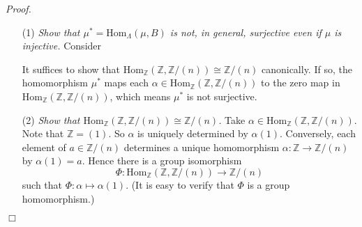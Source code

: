 \documentclass{article}
\begin{document}
\emph{Proof.}
\begin{enumerate}
\item[(1)]
  \emph{Show that $\mu^{*} = \mathrm{Hom}_{\Lambda}(\mu,B)$ is not, in general,
  surjective even if $\mu$ is injective.}
  Consider
  \begin{center}
  \end{center}
  It suffices to show that
  $\mathrm{Hom}_{\mathbb{Z}}(\mathbb{Z},\mathbb{Z}/(n)) \cong \mathbb{Z}/(n)$
  canonically.
  If so, the homomorphism $\mu^{*}$ maps each
  $\alpha \in \mathrm{Hom}_{\mathbb{Z}}(\mathbb{Z},\mathbb{Z}/(n))$
  to the zero map in $\mathrm{Hom}_{\mathbb{Z}}(\mathbb{Z},\mathbb{Z}/(n))$,
  which means $\mu^{*}$ is not surjective.

\item[(2)]
  \emph{Show that $\mathrm{Hom}_{\mathbb{Z}}(\mathbb{Z},\mathbb{Z}/(n)) \cong \mathbb{Z}/(n)$.}
  Take $\alpha \in \mathrm{Hom}_{\mathbb{Z}}(\mathbb{Z},\mathbb{Z}/(n))$.
  Note that $\mathbb{Z} = (1)$.
  So $\alpha$ is uniquely determined by $\alpha(1)$.
  Conversely, each element of $a \in \mathbb{Z}/(n)$ determines
  a unique homomorphism $\alpha: \mathbb{Z} \to \mathbb{Z}/(n)$ by $\alpha(1) = a$.
  Hence there is a group isomorphism
  \[
    \Phi: \mathrm{Hom}_{\mathbb{Z}}(\mathbb{Z},\mathbb{Z}/(n)) \to \mathbb{Z}/(n)
  \]
  such that $\Phi: \alpha \mapsto \alpha(1)$.
  (It is easy to verify that $\Phi$ is a group homomorphism.)
\end{enumerate}
$\Box$ \\\\



\end{document}
